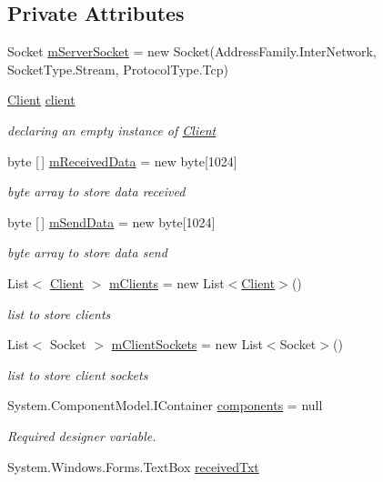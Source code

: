 \subsection*{Private Attributes}
\begin{DoxyCompactItemize}
\item 
Socket \hyperlink{class_socket_server_1_1_socket_server_a3f7c25cca8eb9e7e98dc5172368e8f62}{m\+Server\+Socket} = new Socket(Address\+Family.\+Inter\+Network, Socket\+Type.\+Stream, Protocol\+Type.\+Tcp)
\item 
\hyperlink{class_socket_server_1_1_client}{Client} \hyperlink{class_socket_server_1_1_socket_server_a2c56e560fbab349d4ed56524f1f52f9c}{client}
\begin{DoxyCompactList}\small\item\em declaring an empty instance of \hyperlink{class_socket_server_1_1_client}{Client} \end{DoxyCompactList}\item 
byte \mbox{[}$\,$\mbox{]} \hyperlink{class_socket_server_1_1_socket_server_a989b1e8fe5855a949087d7406db74988}{m\+Received\+Data} = new byte\mbox{[}1024\mbox{]}
\begin{DoxyCompactList}\small\item\em byte array to store data received \end{DoxyCompactList}\item 
byte \mbox{[}$\,$\mbox{]} \hyperlink{class_socket_server_1_1_socket_server_abd27451304549844ef2d93051764fc1a}{m\+Send\+Data} = new byte\mbox{[}1024\mbox{]}
\begin{DoxyCompactList}\small\item\em byte array to store data send \end{DoxyCompactList}\item 
List$<$ \hyperlink{class_socket_server_1_1_client}{Client} $>$ \hyperlink{class_socket_server_1_1_socket_server_ac9461bfbf488d01d0563f1ceb538f4c7}{m\+Clients} = new List$<$\hyperlink{class_socket_server_1_1_client}{Client}$>$()
\begin{DoxyCompactList}\small\item\em list to store clients \end{DoxyCompactList}\item 
List$<$ Socket $>$ \hyperlink{class_socket_server_1_1_socket_server_a7333cc07bf0a885bb0f62f7ecc665742}{m\+Client\+Sockets} = new List$<$Socket$>$()
\begin{DoxyCompactList}\small\item\em list to store client sockets \end{DoxyCompactList}\item 
System.\+Component\+Model.\+I\+Container \hyperlink{class_socket_server_1_1_socket_server_a323fc298b887e4f0f1d764662203703b}{components} = null
\begin{DoxyCompactList}\small\item\em Required designer variable. \end{DoxyCompactList}\item 
System.\+Windows.\+Forms.\+Text\+Box \hyperlink{class_socket_server_1_1_socket_server_aea45323bf62d2f24f8992a0380fd1044}{received\+Txt}
\end{DoxyCompactItemize}


